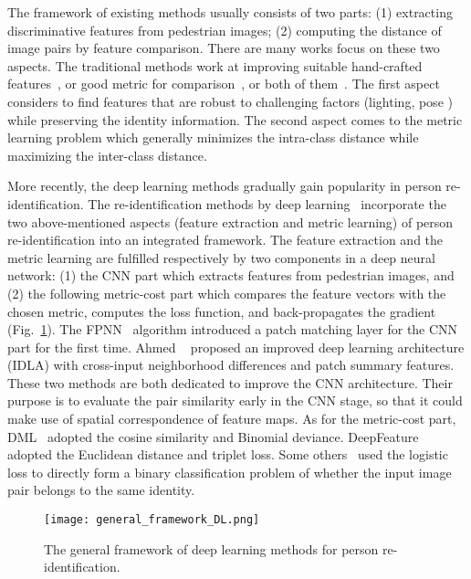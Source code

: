\documentclass[10pt,twocolumn,letterpaper]{article}
\begin{document}
The framework of existing methods usually consists of two parts: (1) extracting discriminative features from pedestrian images; (2) computing the distance of image pairs by feature comparison.
There are many works focus on these two aspects.
The traditional methods work at improving suitable hand-crafted features~\cite{yang2014salient, zhang2014novel, zhao2014learning}, or good metric for comparison~\cite{koestinger2012large, li2013locally, li2013learning, martinel2014saliency, zhao2013person}, or both of them~\cite{khamis2014joint, liao2015person, xiong2014person}. The first aspect considers to find features that are robust to challenging factors (lighting, pose \etc) while preserving the identity information. The second aspect comes to the metric learning problem which generally minimizes the intra-class distance while maximizing the inter-class distance.



More recently, the deep learning methods gradually gain popularity in person re-identification.
The re-identification methods by deep learning~\cite{ahmed2015improved, ding2015deep, li2014deepreid, yi2014deep} incorporate the two above-mentioned aspects (feature extraction and metric learning) of person re-identification into an integrated framework.
The feature extraction and the metric learning are fulfilled respectively by two components in a deep neural network: (1) the CNN part which extracts features from pedestrian images, and (2) the following metric-cost part which compares the feature vectors with the chosen metric, computes the loss function, and back-propagates the gradient (Fig.~\ref{general-framework-DL}).
The FPNN~\cite{li2014deepreid} algorithm introduced a patch matching layer for the CNN part for the first time. Ahmed \etal~\cite{ahmed2015improved} proposed an improved deep learning architecture (IDLA) with cross-input neighborhood differences and patch summary features. These two methods are both dedicated to improve the CNN architecture.
Their purpose is to evaluate the pair similarity early in the CNN stage, so that it could make use of spatial correspondence of feature maps.
As for the metric-cost part, DML~\cite{yi2014deep} adopted the cosine similarity and Binomial deviance.
DeepFeature~\cite{ding2015deep} adopted the Euclidean distance and triplet loss.
Some others~\cite{ahmed2015improved, li2014deepreid} used the logistic loss to directly form a binary classification problem of whether the input image pair belongs to the same identity.

\begin{figure}[!htb]
  \centering
  \texttt{[image: general\_framework\_DL.png]}
  \caption{The general framework of deep learning methods for person re-identification.}
  \label{general-framework-DL}
\end{figure}
\end{document}
